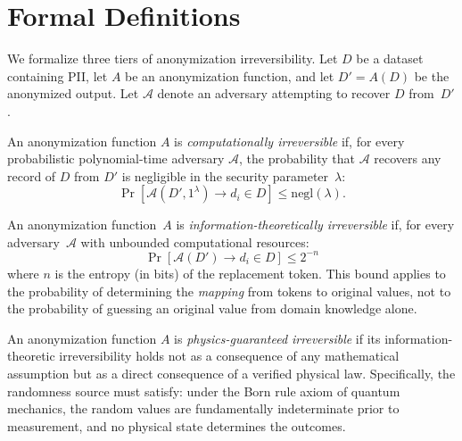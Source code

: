 \documentclass[acmsmall,screen,review,anonymous]{acmart}
\begin{document}
\section{Formal Definitions}
\label{sec:definitions}

We formalize three tiers of anonymization irreversibility. Let $D$ be a dataset containing PII, let $A$ be an anonymization function, and let $D' = A(D)$ be the anonymized output. Let $\mathcal{A}$ denote an adversary attempting to recover $D$ from~$D'$.

\begin{definition}
\label{def:comp}
An anonymization function $A$ is \emph{computationally irreversible} if, for every probabilistic polynomial-time adversary $\mathcal{A}$, the probability that $\mathcal{A}$ recovers any record of $D$ from $D'$ is negligible in the security parameter~$\lambda$:
\begin{equation}
\Pr[\mathcal{A}(D', 1^\lambda) \to d_i \in D] \leq \mathrm{negl}(\lambda).
\end{equation}
\end{definition}

\begin{definition}
\label{def:it}
An anonymization function~$A$ is \emph{information-theoretically irreversible} if, for every adversary~$\mathcal{A}$ with unbounded computational resources:
\begin{equation}
\Pr[\mathcal{A}(D') \to d_i \in D] \leq 2^{-n}
\end{equation}
where $n$ is the entropy (in bits) of the replacement token. This bound applies to the probability of determining the \emph{mapping} from tokens to original values, not to the probability of guessing an original value from domain knowledge alone.
\end{definition}

\begin{definition}
\label{def:phys}
An anonymization function $A$ is \emph{physics-guaranteed irreversible} if its information-theoretic irreversibility holds not as a consequence of any mathematical assumption but as a direct consequence of a verified physical law. Specifically, the randomness source must satisfy: under the Born rule axiom of quantum mechanics, the random values are fundamentally indeterminate prior to measurement, and no physical state determines the outcomes.
\end{definition}
\end{document}
